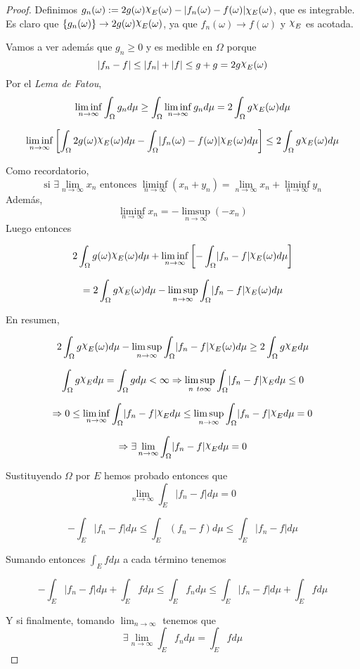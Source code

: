 \documentclass[11pt, a4paper]{article}
\providecommand{\abs}[1]{\lvert#1\rvert}
\DeclareRobustCommand{\rchi}{{\mathpalette\irchi\relax}}
\newcommand{\irchi}[2]{\raisebox{\depth}{$#1\chi$}} %
\theoremstyle{theorem-style}
\theoremstyle{definition-style}
\theoremstyle{remark-style}
\theoremstyle{example-style}
\begin{document}
\begin{proof}
	Definimos $g_n(\omega) := 2g(\omega)\rchi_E(\omega) - \abs{f_n(\omega) - f(\omega)} \chi_E (\omega)$, que es integrable. Es claro que $\{g_n(\omega)\} \rightarrow 2g(\omega)\rchi_E(\omega)$, ya que $f_n(\omega) \rightarrow f(\omega)$ y $\rchi_E$ es acotada.
	
	Vamos a ver además que $g_n \geq 0$ y es medible en $\Omega$ porque $$|f_n - f| \leq |f_n| + |f| \leq g + g = 2g\rchi_E(\omega)$$
	Por el \textit{Lema de Fatou}, 
	$$\liminf_{n \to \infty} \int_{\Omega} g_n d \mu \geq \int_{\Omega} \liminf_{n \to \infty} g_n d \mu = 2 \int_{\Omega} g\rchi_E(\omega)d\mu$$
	
	$$\liminf_{n \to \infty} \left[\int_{\Omega} 2g(\omega)\rchi_E(\omega) d\mu - \int_{\Omega} \abs{f_n(\omega) - f(\omega)}\rchi_E(\omega) d \mu \right] \leq 2\int_{\Omega} g\rchi_E(\omega) d \mu$$

	Como recordatorio, $$\text{si } \exists \lim_{n \to \infty} x_n \text{ entonces } \liminf_{n \to \infty} (x_n + y_n) = \lim_{n \to \infty} x_n + \liminf_{n \to \infty} y_n$$ Además, $$\liminf_{n \to \infty} x_n = - \limsup_{n \to \infty} (- x_n)$$
	Luego entonces
	
	$$2 \int_{\Omega} g(\omega)\rchi_E(\omega) d \mu + \liminf_{n \to \infty} \left[-\int_{\Omega} \abs{f_n - f} \rchi_E(\omega) d \mu \right]$$
	
	$$ = 2 \int_{\Omega} g \rchi_E(\omega) d \mu - \limsup_{n \to \infty} \int_{\Omega} \abs{f_n - f} \rchi_E(\omega) d \mu$$
	
	En resumen,
	
	$$2 \int_{\Omega} g \rchi_E(\omega) d \mu - \limsup_{n \to \infty} \int_{\Omega} \abs{f_n - f} \rchi_E(\omega) d \mu \geq 2 \int_{\Omega} g \rchi_{E} d \mu$$
	
	$$\int_{\Omega} g \rchi_{E} d \mu = \int_{\Omega} g  d \mu < \infty \Rightarrow \limsup_{n \ to \infty} \int_{\Omega} \abs{f_n - f} \rchi_E d \mu \leq 0$$
	
	$$\Rightarrow 0 \leq \liminf_{n \to \infty} \int_{\Omega} \abs{f_n - f} \rchi_E d \mu \leq \limsup_{n \to \infty} \int_{\Omega} \abs{f_n - f} \rchi_E d \mu = 0$$
	
	$$\Rightarrow \exists \lim_{n \to \infty} \int_{\Omega} \abs{f_n - f} \rchi_E d \mu = 0$$
	
	Sustituyendo $\Omega$  por $E$ hemos probado entonces que 
	$$\lim_{n \to \infty} \int_{E} \abs{f_n - f} d \mu = 0$$
	
	$$- \int_E \abs{f_n - f} d \mu \leq \int_E (f_n - f) d \mu \leq \int_E \abs{f_n - f} d \mu$$
	
	Sumando entonces $\displaystyle \int_E f d \mu$ a cada término tenemos
	
	$$ - \int_E \abs{f_n - f} d \mu + \int_E f d \mu \leq \int_E f_n d \mu \leq \int_E \abs{f_n - f} d \mu + \int_E f d \mu$$
	
	Y si finalmente, tomando $\lim_{n \to \infty}$ tenemos que
	$$ \exists \lim_{n \to \infty} \int_E f_n d \mu = \int_E f d \mu$$
\end{proof}
\end{document}
